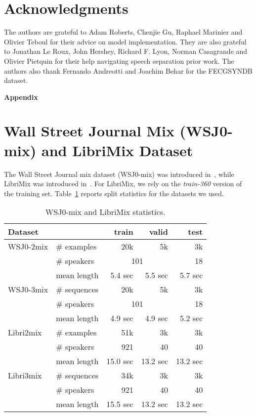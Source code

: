 \documentclass[letterpaper, onecolumn,10 pt]{IEEEtran}
\begin{document}
\vspace{-2mm}
\section*{Acknowledgments}
The authors are grateful to Adam Roberts, Chenjie Gu, Raphael Marinier and Olivier Teboul for their advice on model implementation. They are also grateful to Jonathan Le Roux, John Hershey, Richard F. Lyon, Norman Casagrande and Olivier Pietquin for their help navigating speech separation prior work. The authors also thank Fernando Andreotti and Joachim Behar for the FECGSYNDB dataset. 
\vspace{-2mm}



\clearpage
\appendices 

{\bf \large Appendix}

\section{Wall Street Journal Mix  (WSJ0-mix) and LibriMix Dataset}
\label{appendix:wsj0mix_stats}

The Wall Street Journal mix dataset (WSJ0-mix) was introduced in~\cite{hershey16:deep_clustering}, while LibriMix was introduced in~\cite{librimix}. 
For LibriMix, we rely on the \textit{train-360} version of the training set.
Table~\ref{table:wsj0mix_stats} reports split statistics for the datasets we used.

\begin{table}[h]
        \centering
        \caption{WSJ0-mix and LibriMix statistics.}
        \vspace{0.2cm}
        \label{table:wsj0mix_stats}
        \begin{tabular}{l|l|r|r|r}
        Dataset   &             & train & valid & test\\\hline
        WSJ0-2mix & \# examples &   20k &    5k &   3k \\
                  & \# speakers &  \multicolumn{2}{c|}{101} & 18 \\
                  & mean length &   5.4 sec & 5.5 sec & 5.7 sec \\\hline
        WSJ0-3mix & \# sequences &  20k & 5k & 3k \\
                  & \# speakers & \multicolumn{2}{c|}{101} & 18 \\
                  & mean length &   4.9 sec & 4.9 sec & 5.2 sec \\\hline
        Libri2mix & \# examples &   51k &    3k &   3k \\
                  & \# speakers &  921 & 40 & 40 \\
                  & mean length &   15.0 sec & 13.2 sec & 13.2 sec \\\hline
        Libri3mix & \# sequences &  34k & 3k & 3k \\
                  & \# speakers & 921 & 40 & 40 \\
                  & mean length &   15.5 sec & 13.2 sec & 13.2 sec \\\hline
        \end{tabular}
\end{table}
\end{document}
